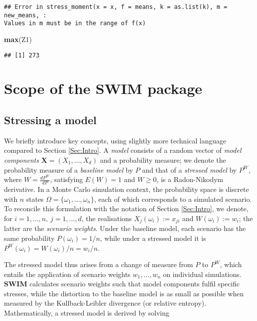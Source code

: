 \documentclass[
]{article}
\newenvironment{Shaded}{\begin{snugshade}}{\end{snugshade}}
\newcommand{\KeywordTok}[1]{\textcolor[rgb]{0.13,0.29,0.53}{\textbf{#1}}}
\newcommand{\NormalTok}[1]{#1}
\begin{document}
\begin{verbatim}
## Error in stress_moment(x = x, f = means, k = as.list(k), m = new_means, :
Values in m must be in the range of f(x)
\end{verbatim}

\begin{Shaded}
\begin{Highlighting}[]
\KeywordTok{max}\NormalTok{(Z1)}
\end{Highlighting}
\end{Shaded}

\begin{verbatim}
## [1] 273
\end{verbatim}

\hypertarget{Sec:Scope}{%
\section{\texorpdfstring{Scope of the \textbf{SWIM} package}{Scope of the SWIM package}}\label{Sec:Scope}}

\hypertarget{Rfunctions}{%
\subsection{Stressing a model}\label{Rfunctions}}

We briefly introduce key concepts, using slightly more technical language compared to Section \ref{Sec:Intro}. A \emph{model} consists of a random vector of \emph{model components} \(\mathbf X = (X_1,\dots,X_d)\) and a probability measure; we denote the probability measure of a \emph{baseline model} by \(P\) and that of a \emph{stressed model} by \(P^W\), where \(W= \frac{dP^W}{dP}\), satisfying \(E(W)=1\) and \(W\geq 0\), is a Radon-Nikodym derivative. In a Monte Carlo simulation context, the probability space is discrete with \(n\) states \(\Omega=\{\omega_1,\dots,\omega_n\}\), each of which corresponds to a simulated scenario. To reconcile this formulation with the notation of Section \ref{Sec:Intro}, we denote, for \(i=1, \dots, n,~j=1,\dots, d\), the realisations \(X_j(\omega_i):= x_{ji}\) and \(W(\omega_i):=w_i\); the latter are the \emph{scenario weights}. Under the baseline model, each scenario has the same probability \(P(\omega_i)=1/n\), while under a stressed model it is \(P^W(\omega_i)=W(\omega_i)/n=w_i/n\).

The stressed model thus arises from a change of measure from \(P\) to \(P^W\), which entails the application of scenario weights \(w_1,\dots, w_n\) on individual simulations. \textbf{SWIM} calculates scenario weights such that model components fulfil specific stresses, while the distortion to the baseline model is as small as possible when measured by the Kullback-Leibler divergence (or relative entropy). Mathematically, a stressed model is derived by solving
\end{document}
